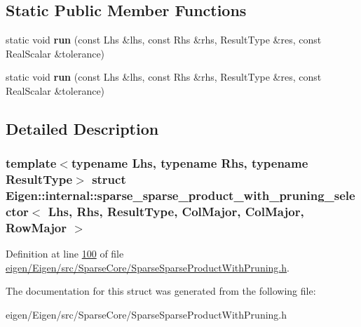 \subsection*{Static Public Member Functions}
\begin{DoxyCompactItemize}
\item 
\mbox{\label{struct_eigen_1_1internal_1_1sparse__sparse__product__with__pruning__selector_3_01_lhs_00_01_rhs_21e1c567bb33db704730c4eb2830e598_a77924e7e4cd8a2d3bf5dca49ad937ee8}} 
static void {\bfseries run} (const Lhs \&lhs, const Rhs \&rhs, Result\+Type \&res, const Real\+Scalar \&tolerance)
\item 
\mbox{\label{struct_eigen_1_1internal_1_1sparse__sparse__product__with__pruning__selector_3_01_lhs_00_01_rhs_21e1c567bb33db704730c4eb2830e598_a77924e7e4cd8a2d3bf5dca49ad937ee8}} 
static void {\bfseries run} (const Lhs \&lhs, const Rhs \&rhs, Result\+Type \&res, const Real\+Scalar \&tolerance)
\end{DoxyCompactItemize}


\subsection{Detailed Description}
\subsubsection*{template$<$typename Lhs, typename Rhs, typename Result\+Type$>$\newline
struct Eigen\+::internal\+::sparse\+\_\+sparse\+\_\+product\+\_\+with\+\_\+pruning\+\_\+selector$<$ Lhs, Rhs, Result\+Type, Col\+Major, Col\+Major, Row\+Major $>$}



Definition at line \hyperlink{eigen_2_eigen_2src_2_sparse_core_2_sparse_sparse_product_with_pruning_8h_source_l00100}{100} of file \hyperlink{eigen_2_eigen_2src_2_sparse_core_2_sparse_sparse_product_with_pruning_8h_source}{eigen/\+Eigen/src/\+Sparse\+Core/\+Sparse\+Sparse\+Product\+With\+Pruning.\+h}.



The documentation for this struct was generated from the following file\+:\begin{DoxyCompactItemize}
\item 
eigen/\+Eigen/src/\+Sparse\+Core/\+Sparse\+Sparse\+Product\+With\+Pruning.\+h\end{DoxyCompactItemize}
